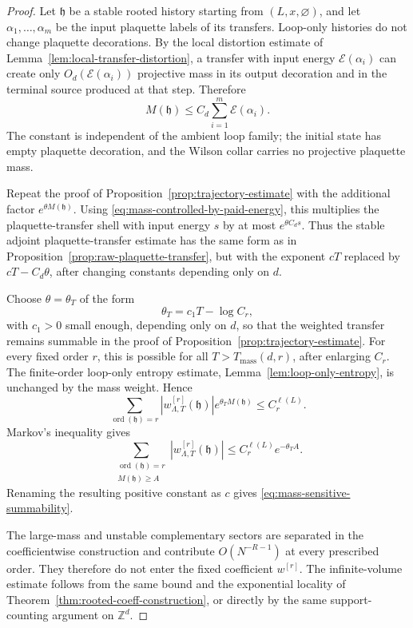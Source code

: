 \documentclass[11pt,a4paper,reqno]{amsart}
\theoremstyle{definition}
\theoremstyle{remark}
\newcommand\Z{{\mathbb{Z}}}
\begin{document}
\begin{proof}
Let $\mathfrak h$ be a stable rooted history starting from $(L,x,\varnothing)$, and let $\alpha_1,\ldots,\alpha_m$ be the input plaquette labels of its transfers. Loop-only histories do not change plaquette decorations. By the local distortion estimate of Lemma~\ref{lem:local-transfer-distortion}, a transfer with input energy $\mathcal E(\alpha_i)$ can create only $O_d(\mathcal E(\alpha_i))$ projective mass in its output decoration and in the terminal source produced at that step. Therefore
\begin{equation}\label{eq:mass-controlled-by-paid-energy}
M(\mathfrak h)
\le C_d\sum_{i=1}^m \mathcal E(\alpha_i).
\end{equation}
The constant is independent of the ambient loop family; the initial state has empty plaquette decoration, and the Wilson collar carries no projective plaquette mass.

Repeat the proof of Proposition~\ref{prop:trajectory-estimate} with the additional factor $e^{\theta M(\mathfrak h)}$. Using \eqref{eq:mass-controlled-by-paid-energy}, this multiplies the plaquette-transfer shell with input energy $s$ by at most $e^{\theta C_d s}$. Thus the stable adjoint plaquette-transfer estimate has the same form as in Proposition~\ref{prop:raw-plaquette-transfer}, but with the exponent $cT$ replaced by $cT-C_d\theta$, after changing constants depending only on $d$.

Choose $\theta=\theta_T$ of the form
\[
\theta_T=c_1T-\log C_r,
\]
with $c_1>0$ small enough, depending only on $d$, so that the weighted transfer remains summable in the proof of Proposition~\ref{prop:trajectory-estimate}. For every fixed order $r$, this is possible for all $T>T_{\mathrm{mass}}(d,r)$, after enlarging $C_r$. The finite-order loop-only entropy estimate, Lemma~\ref{lem:loop-only-entropy}, is unchanged by the mass weight. Hence
\[
\sum_{\operatorname{ord}(\mathfrak h)=r}
|w^{[r]}_{\Lambda,T}(\mathfrak h)|e^{\theta_T M(\mathfrak h)}
\le C_r^{\ell(L)}.
\]
Markov's inequality gives
\[
\sum_{\substack{\operatorname{ord}(\mathfrak h)=r\\ M(\mathfrak h)\ge A}}
|w^{[r]}_{\Lambda,T}(\mathfrak h)|
\le C_r^{\ell(L)}e^{-\theta_TA}.
\]
Renaming the resulting positive constant as $c$ gives \eqref{eq:mass-sensitive-summability}.

The large-mass and unstable complementary sectors are separated in the coefficientwise construction and contribute $O(N^{-R-1})$ at every prescribed order. They therefore do not enter the fixed coefficient $w^{[r]}$. The infinite-volume estimate follows from the same bound and the exponential locality of Theorem~\ref{thm:rooted-coeff-construction}, or directly by the same support-counting argument on $\Z^d$.
\end{proof}
\end{document}
